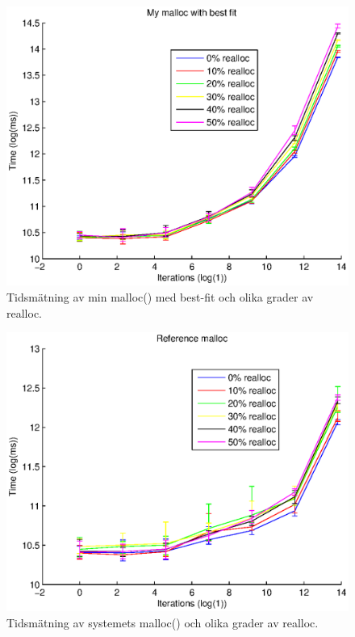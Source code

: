 \documentclass[10pt,a4paper]{article}
\begin{document}
\begin{figure}
\includegraphics[scale=0.7]{../results/my2.eps}
\caption{Tidsmätning av min malloc() med best-fit och olika grader av realloc.}
\label{fig:my2}
\end{figure}

\begin{figure}
\includegraphics[scale=0.7]{../results/ref.eps}
\caption{Tidsmätning av systemets malloc() och olika grader av realloc.}
\label{fig:stock}
\end{figure}
\end{document}
